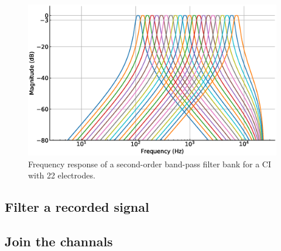 \documentclass{scrartcl}			%
\begin{document}
\begin{figure}[H]
\includegraphics[width=\linewidth]{imgs/ci_with_22_electrodes.eps}
    \caption{Frequency response of a second-order  band-pass filter bank for a CI with 22 electrodes.} 
    \label{fig:ci_22} 
\end{figure}

\subsection{Filter a recorded signal}

\subsection{Join the channals}
\end{document}
